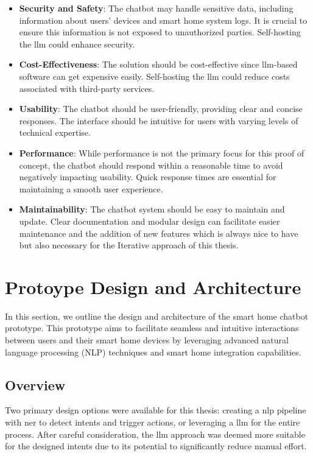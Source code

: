 \begin{itemize}
    \item \textbf{Security and Safety}: The chatbot may handle sensitive data, including information about users' devices and smart home system logs. It is crucial to ensure this information is not exposed to unauthorized parties. Self-hosting the \gls{llm} could enhance security.
    
    \item \textbf{Cost-Effectiveness}: The solution should be cost-effective since \gls{llm}-based software can get expensive easily. Self-hosting the \gls{llm} could reduce costs associated with third-party services.
    
    \item \textbf{Usability}: The chatbot should be user-friendly, providing clear and concise responses. The interface should be intuitive for users with varying levels of technical expertise. 
    
    \item \textbf{Performance}: While performance is not the primary focus for this proof of concept, the chatbot should respond within a reasonable time to avoid negatively impacting usability. Quick response times are essential for maintaining a smooth user experience.
        
    \item \textbf{Maintainability}: The chatbot system should be easy to maintain and update. Clear documentation and modular design can facilitate easier maintenance and the addition of new features which is always nice to have but also necessary for the Iterative approach of this thesis.
\end{itemize}

\section{Protoype Design and Architecture}
\label{sec:design}
In this section, we outline the design and architecture of the smart home chatbot prototype. This prototype aims to facilitate seamless and intuitive interactions between users and their smart home devices by leveraging advanced natural language processing (NLP) techniques and smart home integration capabilities.

\subsection{Overview}
Two primary design options were available for this thesis: creating a \gls{nlp} pipeline with \gls{ner} to detect intents and trigger actions, or leveraging a \gls{llm} for the entire process. After careful consideration, the \gls{llm} approach was deemed more suitable for the designed intents due to its potential to significantly reduce manual effort.

